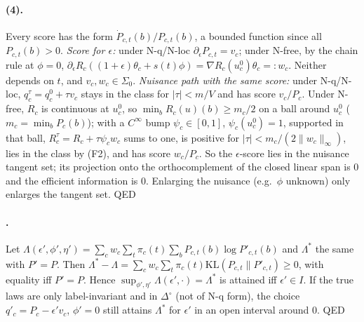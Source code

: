 \documentclass[10pt,twocolumn]{article}
\theoremstyle{definition}
\theoremstyle{remark}
\renewcommand{\qedsymbol}{{\normalfont\small QED}}
\newcommand{\eps}{\epsilon}
\newcommand{\KL}{\mathrm{KL}}
\newcommand{\simp}{\Delta^{\circ}}
\begin{document}
\paragraph{(4).} Every score has the form $\dot P_{c,t}(b)/P_{c,t}(b)$, a bounded function since all $P_{c,t}(b)>0$. \emph{Score for $\eps$:} under N-q/N-loc $\partial_\eps P_{c,t}=v_c$; under N-free, by the chain rule at $\phi=0$, $\partial_\eps R_c((1+\eps)\theta_c+s(t)\phi)=\nabla R_c(u^0_c)\theta_c=:w_c$. Neither depends on $t$, and $v_c,w_c\in\Sigma_0$. \emph{Nuisance path with the same score:} under N-q/N-loc, $q^\tau_c=q^0_c+\tau v_c$ stays in the class for $|\tau|<m/V$ and has score $v_c/P_c$. Under N-free, $R_c$ is continuous at $u^0_c$, so $\min_bR_c(u)(b)\ge m_c/2$ on a ball around $u^0_c$ ($m_c=\min_bP_c(b)$); with a $C^\infty$ bump $\psi_c\in[0,1]$, $\psi_c(u^0_c)=1$, supported in that ball, $R^\tau_c=R_c+\tau\psi_cw_c$ sums to one, is positive for $|\tau|<m_c/(2\|w_c\|_\infty)$, lies in the class by (F2), and has score $w_c/P_c$. So the $\eps$-score lies in the nuisance tangent set; its projection onto the orthocomplement of the closed linear span is $0$ and the efficient information is $0$. Enlarging the nuisance (e.g.\ $\phi$ unknown) only enlarges the tangent set. \hfill\qedsymbol

\paragraph{.} Let $\Lambda(\eps',\phi',\eta')=\sum_cw_c\sum_t\pi_c(t)\sum_bP_{c,t}(b)\log P'_{c,t}(b)$ and $\Lambda^*$ the same with $P'=P$. Then $\Lambda^*-\Lambda=\sum_cw_c\sum_t\pi_c(t)\KL(P_{c,t}\|P'_{c,t})\ge0$, with equality iff $P'=P$. Hence $\sup_{\phi',\eta'}\Lambda(\eps',\cdot)=\Lambda^*$ is attained iff $\eps'\in I$. If the true laws are only label-invariant and in $\simp$ (not of N-q form), the choice $q'_c=P_c-\eps'v_c$, $\phi'=0$ still attains $\Lambda^*$ for $\eps'$ in an open interval around $0$. \hfill\qedsymbol
\end{document}
